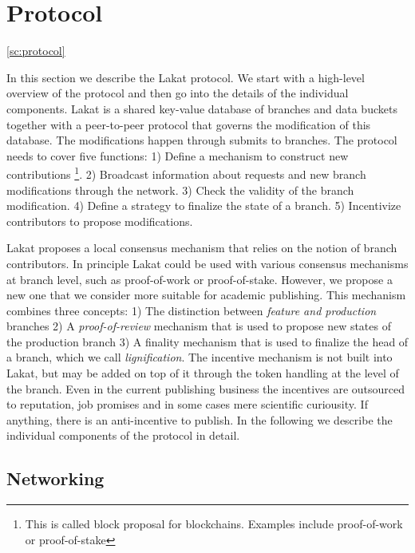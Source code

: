 \section{Protocol}
\ref{sc:protocol}

In this section we describe the Lakat protocol. We start with a high-level overview of the protocol and then go into the details of the individual components. Lakat is a shared key-value database of branches and data buckets together with a peer-to-peer protocol that governs the modification of this database. The modifications happen through submits to branches. The protocol needs to cover five functions: 1) Define a mechanism to construct new contributions \footnote{This is called block proposal for blockchains. Examples include proof-of-work or proof-of-stake}. 2) Broadcast information about requests and new branch modifications through the network. 3) Check the validity of the branch modification. 4) Define a strategy to finalize the state of a branch. 5) Incentivize contributors to propose modifications. 

Lakat proposes a local consensus mechanism that relies on the notion of branch contributors. In principle Lakat could be used with various consensus mechanisms at branch level, such as proof-of-work or proof-of-stake. However, we propose a new one that we consider more suitable for academic publishing. This mechanism combines three concepts: 1) The distinction between \textit{feature and production} branches 2) A \textit{proof-of-review} mechanism that is used to propose new states of the production branch 3) A finality mechanism that is used to finalize the head of a branch, which we call \textit{lignification}. The incentive mechanism is not built into Lakat, but may be added on top of it through the token handling at the level of the branch. Even in the current publishing business the incentives are outsourced to reputation, job promises and in some cases mere scientific curiousity. If anything, there is an anti-incentive to publish. In the following we describe the individual components of the protocol in detail.

\subsection{Networking}
\label{ssc:networking}

